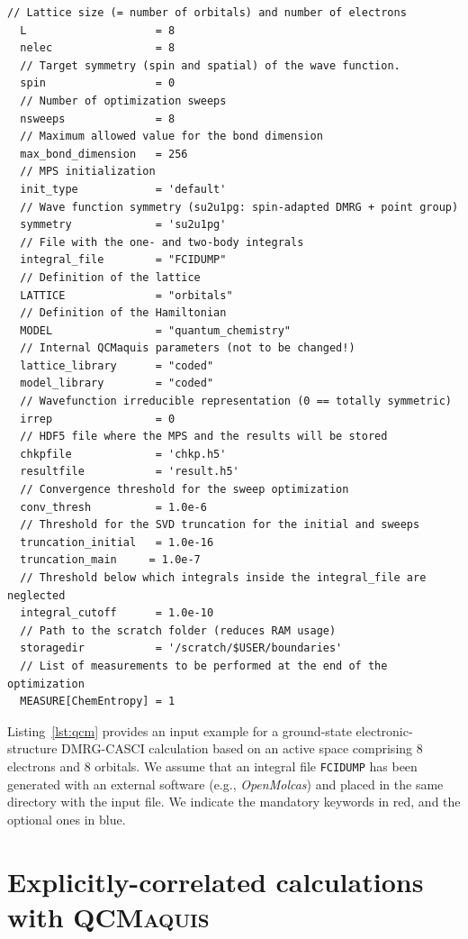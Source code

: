 \documentclass[bibliography=totoc,12pt,a4paper]{scrartcl}
\newcommand{\qcm}{\textsc{QCMaquis}}
\begin{document}
\begin{lstlisting}[language=qcmaquis,
				   caption={Input example for a DMRG-CASCI(8,8) standalone \qcm{} calculation},
				   label=lst:qcm]
  // Lattice size (= number of orbitals) and number of electrons
  L                    = 8
  nelec                = 8
  // Target symmetry (spin and spatial) of the wave function.
  spin                 = 0
  // Number of optimization sweeps
  nsweeps              = 8
  // Maximum allowed value for the bond dimension
  max_bond_dimension   = 256
  // MPS initialization
  init_type            = 'default'
  // Wave function symmetry (su2u1pg: spin-adapted DMRG + point group)
  symmetry             = 'su2u1pg'
  // File with the one- and two-body integrals
  integral_file        = "FCIDUMP"
  // Definition of the lattice
  LATTICE              = "orbitals"
  // Definition of the Hamiltonian
  MODEL                = "quantum_chemistry"
  // Internal QCMaquis parameters (not to be changed!)
  lattice_library      = "coded"
  model_library        = "coded"
  // Wavefunction irreducible representation (0 == totally symmetric)
  irrep                = 0
  // HDF5 file where the MPS and the results will be stored
  chkpfile             = 'chkp.h5'
  resultfile           = 'result.h5'
  // Convergence threshold for the sweep optimization
  conv_thresh          = 1.0e-6
  // Threshold for the SVD truncation for the initial and sweeps
  truncation_initial   = 1.0e-16
  truncation_main     = 1.0e-7
  // Threshold below which integrals inside the integral_file are neglected
  integral_cutoff      = 1.0e-10
  // Path to the scratch folder (reduces RAM usage)
  storagedir           = '/scratch/$USER/boundaries'
  // List of measurements to be performed at the end of the optimization
  MEASURE[ChemEntropy] = 1
\end{lstlisting}

Listing~\ref{lst:qcm} provides an input example for a ground-state electronic-structure DMRG-CASCI calculation based on an active space comprising 8 electrons and 8 orbitals.
We assume that an integral file \texttt{FCIDUMP} has been generated with an external software (e.g., \textsl{OpenMolcas}) and placed in the same directory with the input file.
We indicate the mandatory keywords in red, and the optional ones in blue.

\section{Explicitly-correlated calculations with \qcm{}}
\label{sec:Transcorrelated}
\end{document}
